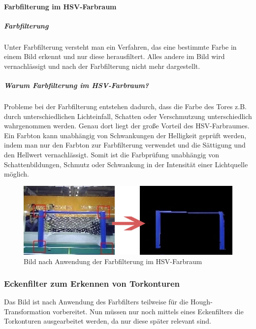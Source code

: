 \documentclass[a4paper,12pt]{article}
\begin{document}
\paragraph{Farbfilterung im HSV-Farbraum}
\subparagraph{Farbfilterung}
Unter Farbfilterung versteht man ein Verfahren, das eine bestimmte Farbe in einem Bild erkennt und nur diese herausfiltert. Alles andere im Bild wird vernachlässigt und nach der Farbfilterung nicht mehr dargestellt.
\subparagraph{Warum Farbfilterung im HSV-Farbraum?}
Probleme bei der Farbfilterung entstehen dadurch, dass die Farbe des Tores z.B. durch unterschiedlichen Lichteinfall, Schatten oder Verschmutzung unterschiedlich wahrgenommen werden. Genau dort liegt der große Vorteil des HSV-Farbraumes. Ein Farbton kann unabhängig von Schwankungen der Helligkeit geprüft werden, indem man nur den Farbton zur Farbfilterung verwendet und die Sättigung und den Hellwert vernachlässigt. Somit ist die Farbprüfung unabhängig von Schattenbildungen, Schmutz oder Schwankung in der Intensität einer Lichtquelle möglich.
\begin{figure}[H]
\includegraphics[scale=0.6]{farb-filterung.jpg}
\caption{Bild nach Anwendung der Farbfilterung im HSV-Farbraum}
\label{fig:farb-filterung}
\end{figure}

\subsubsection{Eckenfilter zum Erkennen von Torkonturen} 
Das Bild ist nach Anwendung des Farbfilters teilweise für die Hough-Transformation vorbereitet. Nun müssen nur noch mittels eines Eckenfilters die Torkonturen ausgearbeitet werden, da nur diese später relevant sind.
\end{document}
